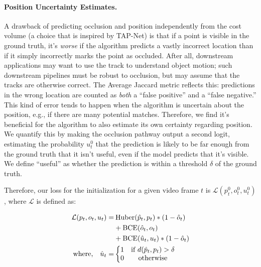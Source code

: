 \documentclass[10pt,twocolumn,letterpaper]{article}
\begin{document}
\paragraph{Position Uncertainty Estimates.} A drawback of predicting occlusion and position independently from the cost volume (a choice that is inspired by TAP-Net)
is that if a point is visible in the ground truth, it's \emph{worse} if the algorithm predicts a vastly incorrect location than if it simply incorrectly marks the point as occluded.  After all, downstream applications may want to use the track to understand object motion; such downstream pipelines must be robust to occlusion, but may assume that the tracks are otherwise correct.  The Average Jaccard metric reflects this: predictions in the wrong location are counted as \emph{both} a ``false positive'' and a ``false negative.''  This kind of error tends to happen when the algorithm is uncertain about the position, e.g., if there are many potential matches.  Therefore, we find it's beneficial for the algorithm to also estimate its own certainty regarding position.  We quantify this by making the occlusion pathway output a second logit, estimating the probability $u^{0}_{t}$ that the prediction is likely to be far enough from the ground truth that it isn't useful, even if the model predicts that it's visible.  We define ``useful'' as whether the prediction is within a threshold $\delta$ of the ground truth.  

Therefore, our loss for the initialization for a given video frame $t$ is $\mathcal{L}(p_t^0,o_t^0,u_t^0)$, where $\mathcal{L}$ is defined as:

\begin{align}
\begin{split}
\mathcal{L}(p_t,o_t,u_t) =&  \hspace{0.2em} \mbox{Huber}(\hat{p}_t,p_t)*(1-\hat{o}_t) \\
                & +\mbox{BCE}(\hat{o}_t,o_t) \\
                & +\mbox{BCE}(\hat{u}_t,u_t)*(1-\hat{o}_t) \\
\mbox{where,}\quad \hat{u}_t =& \left\{\begin{matrix}
1 & \mbox{if } d(\hat{p}_t,p_t) > \delta \\
0 & \mbox{otherwise}
\end{matrix}\right.
\end{split}
\end{align}
\end{document}
